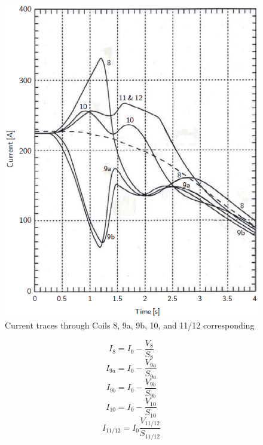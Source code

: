 {\begin{figure}
	\centering
	\includegraphics[scale=0.6]{chpt8/figs/fig8.29.eps}
	\caption{Current traces through Coils 8, 9a, 9b, 10, and 11/12 corresponding}
\end{figure}



\begin{equation}%
I_8=I_0-\frac{V_8}{S_8}
\end{equation}
\begin{equation}%
I_{9a}=I_0-\frac{V_{9a}}{S_{9a}}
\end{equation}
\begin{equation}%
I_{9b}=I_0-\frac{V_{9b}}{S_{9b}}
\end{equation}
\begin{equation}%
I_{10}=I_0-\frac{V_{10}}{S_{10}}
\end{equation}
\begin{equation}%
I_{11/12}=I_0\frac{V_{11/12}}{S_{11/12}}
\end{equation}


}
